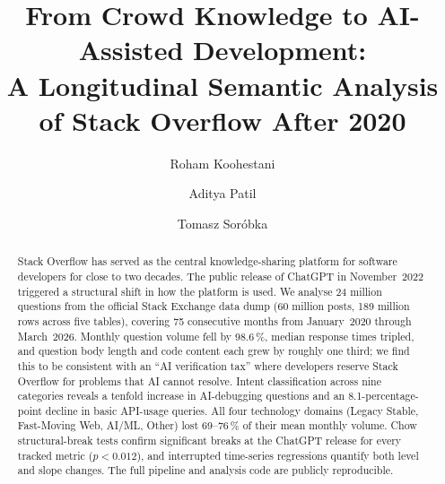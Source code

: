 \documentclass[sigconf]{acmart}
\begin{document}
\title{From Crowd Knowledge to AI-Assisted Development:\\
A Longitudinal Semantic Analysis of
Stack Overflow After 2020}

\author{Roham Koohestani}

\author{Aditya Patil}

\author{Tomasz Sor\'{o}bka}

\begin{abstract}
Stack Overflow has served as the central
knowledge-sharing platform for software developers
for close to two decades.
The public release of ChatGPT in November~2022
triggered a structural shift in how the platform is used.
We analyse \num{24} million questions
from the official Stack Exchange data dump
(\num{60} million posts, \num{189} million rows
across five tables),
covering 75 consecutive months
from January~2020 through March~2026.
Monthly question volume fell by 98.6\,\%,
median response times tripled,
and question body length and code content
each grew by roughly one third;
we find this to be consistent
with an \enquote{AI verification tax}
where developers reserve Stack Overflow
for problems that AI cannot resolve.
Intent classification across nine categories
reveals a tenfold increase in AI-debugging
questions and an 8.1-percentage-point decline
in basic API-usage queries.
All four technology domains
(Legacy Stable, Fast-Moving Web, AI/ML, Other)
lost 69--76\,\% of their mean monthly volume.
Chow structural-break tests confirm
significant breaks at the ChatGPT release
for every tracked metric ($p < 0.012$),
and interrupted time-series regressions
quantify both level and slope changes.
The full pipeline and analysis code are
publicly reproducible.
\end{abstract}


\maketitle
\end{document}
